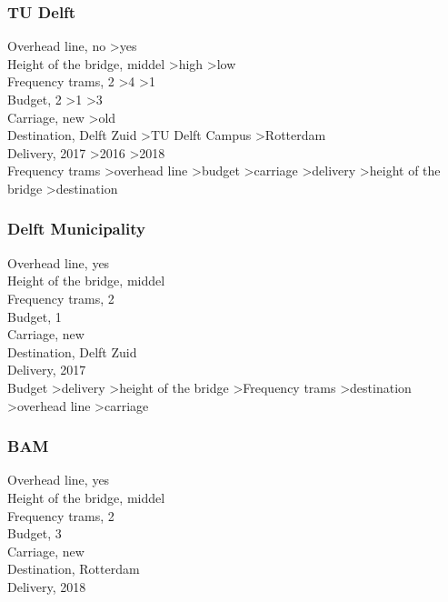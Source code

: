 \documentclass{article}
\begin{document}
\subsubsection*{TU Delft}
Overhead line, no \textgreater yes \\
Height of the bridge, middel  \textgreater high \textgreater low \\
Frequency trams, 2 \textgreater 4 \textgreater 1 \\
Budget, 2 \textgreater 1 \textgreater 3 \\
Carriage, new \textgreater old \\
Destination, Delft Zuid \textgreater TU Delft Campus \textgreater Rotterdam \\
Delivery, 2017 \textgreater 2016 \textgreater 2018 \\


Frequency trams \textgreater overhead line \textgreater budget \textgreater carriage \textgreater delivery \textgreater height of the bridge \textgreater destination \\

\subsubsection*{Delft Municipality}
Overhead line, yes \\
Height of the bridge, middel \\
Frequency trams, 2 \\
Budget, 1 \\
Carriage, new \\
Destination, Delft Zuid \\
Delivery, 2017 \\


Budget \textgreater delivery \textgreater height of the bridge \textgreater Frequency trams \textgreater destination \textgreater overhead line \textgreater carriage\\

\subsubsection*{BAM}
Overhead line, yes \\
Height of the bridge, middel \\
Frequency trams, 2 \\
Budget, 3 \\
Carriage, new \\
Destination, Rotterdam \\
Delivery, 2018 \\
\end{document}
